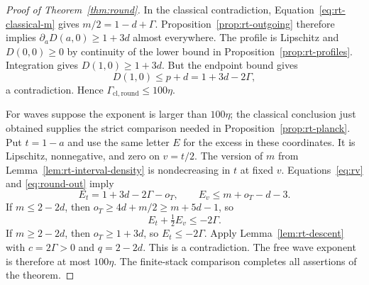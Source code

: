 \begin{proof}[Proof of Theorem~\ref{thm:round}]
In the classical contradiction,
Equation~\eqref{eq:rt-classical-m} gives
$m/2=1-d+\Gamma$.  Proposition~\ref{prop:rt-outgoing}
therefore implies
$\partial_aD(a,0)\ge1+3d$ almost everywhere.
The profile is Lipschitz and $D(0,0)\ge0$ by continuity of the
lower bound in Proposition~\ref{prop:rt-profiles}.  Integration
gives $D(1,0)\ge1+3d$.  But the endpoint bound gives
\[
 D(1,0)\le p+d=1+3d-2\Gamma,
\]
a contradiction.  Hence
$\Gamma_{\mathrm{cl},\mathrm{round}}\le100\eta$.

For waves suppose the exponent is larger than $100\eta$; the
classical conclusion just obtained supplies the strict comparison
needed in Proposition~\ref{prop:rt-planck}.  Put $t=1-a$ and
use the same letter $E$ for the excess in these coordinates.
It is Lipschitz, nonnegative, and zero on $v=t/2$.
The version of $m$ from Lemma~\ref{lem:rt-interval-density} is
nondecreasing in $t$ at fixed $v$.  Equations~\eqref{eq:rv}
and \eqref{eq:round-out} imply
\[
 E_t=1+3d-2\Gamma-o_T,
 \qquad E_v\le m+o_T-d-3.
\]
If $m\le2-2d$, then
$o_T\ge4d+m/2\ge m+5d-1$, so
\[
 E_t+\tfrac12E_v\le-2\Gamma.
\]
If $m\ge2-2d$, then $o_T\ge1+3d$, so
$E_t\le-2\Gamma$.
Apply Lemma~\ref{lem:rt-descent} with
$c=2\Gamma>0$ and $q=2-2d$.  This is a contradiction.
The free wave exponent is therefore at most $100\eta$.
The finite-stack comparison completes all assertions of the theorem.
\end{proof}
